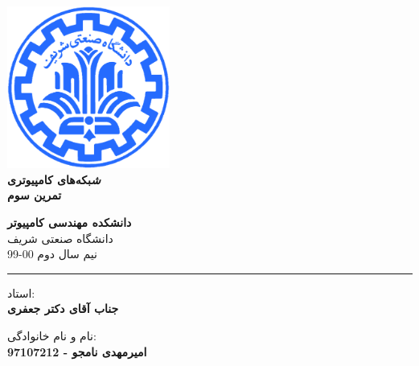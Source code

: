 \documentclass[12pt]{article}
\begin{document}
	
	
	\begin{titlepage}
		\begin{center}
			
			\vspace*{0.7cm}
			
			\includegraphics[width=0.4\textwidth]{sharif1.png}\\
			\vspace{0.5cm}
			\textbf{ \Huge{\emph  ﺷﺒﻜﻪ‌های کامپیوتری} }\\
			\vspace{0.5cm}
			\textbf{ \Large{ تمرین سوم} }
			\vspace{0.2cm}
			
			
			\large \textbf{دانشکده مهندسی کامپیوتر}\\\vspace{0.2cm}
			\large   دانشگاه صنعتی شریف\\\vspace{0.2cm}
			\large   ﻧﯿﻢ سال دوم 00-99 \\\vspace{0.2cm}
			\noindent\rule[1ex]{\linewidth}{1pt}
			استاد:\\
			\textbf{{جناب آقای دکتر جعفری}}
			
			
			\vspace{0.15cm}
			نام و نام خانوادگی:\\
			
			
			\textbf{{امیرمهدی نامجو - 97107212}}
		\end{center}
	\end{titlepage}
	
	
	\newpage
	\pagestyle{fancy}
	\fancyhf{}
	\fancyfoot{}
	\cfoot{\thepage}
	
\end{document}
